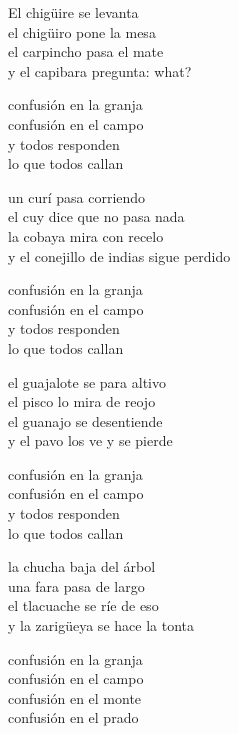 \begin{lyrics}
El chigüire se levanta\\
el chigüiro pone la mesa\\
el carpincho pasa el mate\\
y el capibara pregunta: what?

confusión en la granja\\
confusión en el campo\\
y todos responden\\
lo que todos callan

un curí pasa corriendo\\
el cuy dice que no pasa nada\\
la cobaya mira con recelo\\
y el conejillo de indias sigue perdido

confusión en la granja\\
confusión en el campo\\
y todos responden\\
lo que todos callan

el guajalote se para altivo\\
el pisco lo mira de reojo\\
el guanajo se desentiende\\
y el pavo los ve y se pierde

confusión en la granja\\
confusión en el campo\\
y todos responden\\
lo que todos callan

la chucha baja del árbol\\
una fara pasa de largo\\
el tlacuache se ríe de eso\\
y la zarigüeya se hace la tonta

confusión en la granja\\
confusión en el campo\\
confusión en el monte\\
confusión en el prado
\end{lyrics}

